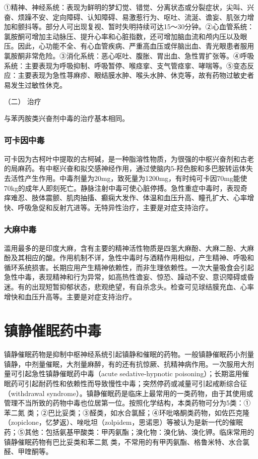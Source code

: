 ①精神、神经系统：表现为鲜明的梦幻觉、错觉、分离状态或分裂症状，尖叫、兴奋、烦躁不安、定向障碍、认知障碍、易激惹行为、呕吐、流涎、谵妄、肌张力增加和颤抖等。部分人可出现复视、暂时失明持续可达15～30分钟。②心血管系统：氯胺酮可增加主动脉压、提升心率和心脏指数，还可增加脑血流和颅内压以及眼压。因此，心功能不全、有心血管疾病、严重高血压或伴脑出血、青光眼患者服用氯胺酮非常危险。③消化系统：恶心呕吐、腹胀、胃出血、急性胃扩张等。④呼吸系统：主要表现为呼吸抑制、呼吸暂停、喉痉挛、支气管痉挛、哮喘等。⑤变态反应：主要表现为急性荨麻疹、眼结膜水肿、喉头水肿、休克等，故有药物过敏史者易发生过敏性休克。

\hypertarget{text00131.htmlux5cux23CHP5-2-1-3-2}{}
（二） 治疗

与苯丙胺类兴奋剂中毒的治疗基本相同。

\subsubsection{可卡因中毒}

可卡因为古柯叶中提取的古柯碱，是一种脂溶性物质，为很强的中枢兴奋剂和古老的局麻药。有中枢兴奋和拟交感神经作用，通过使脑内5-羟色胺和多巴胺转运体失去活性产生作用。中毒剂量为20mg，致死量为1200mg，有时纯可卡因70mg能使70kg的成年人即刻死亡。静脉注射中毒可使心脏停搏。急性重症中毒时，表现奇痒难忍、肢体震颤、肌肉抽搐、癫痫大发作、体温和血压升高、瞳孔扩大、心率增快、呼吸急促和反射亢进等。无特异性治疗，主要是对症支持治疗。

\subsubsection{大麻中毒}

滥用最多的是印度大麻，含有主要的精神活性物质是四氢大麻酚、大麻二酚、大麻酚及其相应的酸。作用机制不详，急性中毒时与酒精作用相似，产生精神、呼吸和循环系统损害。长期应用产生精神依赖性，而非生理依赖性。一次大量吸食会引起急性中毒，表现精神和行为异常，如高热性谵妄、惊恐、躁动不安、意识障碍或昏迷。有的出现短暂抑郁状态，悲观绝望，有自杀念头。检查可见球结膜充血、心率增快和血压升高等。主要是对症支持治疗。

\protect\hypertarget{text00132.html}{}{}

\section{镇静催眠药中毒}

镇静催眠药物是抑制中枢神经系统引起镇静和催眠的药物。一般镇静催眠药小剂量镇静，中剂量催眠，大剂量麻醉，有的还有抗惊厥、抗精神病作用。一次服用大剂量可引起急性镇静催眠药中毒（acute
sedative-hypnotic
poisoning）；长期滥用催眠药可引起耐药性和依赖性而导致慢性中毒；突然停药或减量可引起戒断综合征（withdrawal
syndrome）。镇静催眠药是临床上最常用的一类药物，由于其使用或管理不当所致的药物中毒也位居第一位。按照化学结构，本类药物可分为5类：①苯二氮{}
类；②巴比妥类；③醛类，如水合氯醛；④环吡咯酮类药物，如佐匹克隆（zopiclone，忆梦返）、唑吡坦（zolpidem，思诺思）等被认为是新一代的催眠药；⑤其他：包括氨基甲酸类：甲丙氨酯；溴化物：溴化钠、溴化钾。临床常用的镇静催眠药物有巴比妥类和苯二氮{}
类，不常用的有甲丙氨酯、格鲁米特、水合氯醛、甲喹酮等。

